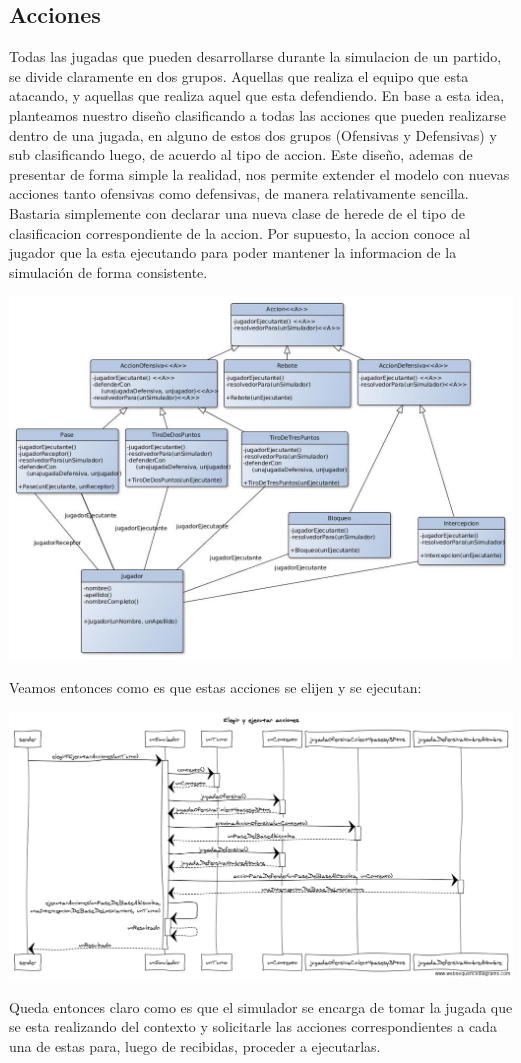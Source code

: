 \subsection{Acciones}
Todas las jugadas que pueden desarrollarse durante la simulacion de un partido, se divide claramente en dos grupos. Aquellas que realiza el equipo que esta atacando, y aquellas que realiza aquel que esta defendiendo. En base a esta idea, planteamos nuestro diseño clasificando a todas las acciones que pueden realizarse dentro de una jugada, en alguno de estos dos grupos (Ofensivas y Defensivas) y sub clasificando luego, de acuerdo al tipo de accion.
Este diseño, ademas de presentar de forma simple la realidad, nos permite extender el modelo con nuevas acciones tanto ofensivas como defensivas, de manera relativamente sencilla. Bastaria simplemente con declarar una nueva clase de herede de el tipo de clasificacion correspondiente de la accion. Por supuesto, la accion conoce al jugador que la esta ejecutando para poder mantener la informacion de la simulación de forma consistente.
\begin{center}
\includegraphics[scale=0.35]{diseno/acciones.jpg}
\end{center}

Veamos entonces como es que estas acciones se elijen y se ejecutan:
\begin{center}
\includegraphics[scale=0.35]{diseno/Elegir_y_ejecutar_acciones.png}
\end{center}
Queda entonces claro como es que el simulador se encarga de tomar la jugada que se esta realizando del contexto y solicitarle las acciones correspondientes a cada una de estas para, luego de recibidas, proceder a ejecutarlas.

